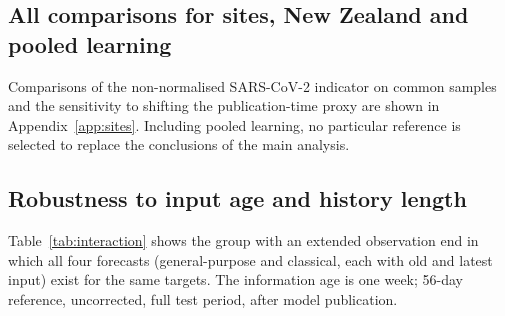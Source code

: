 \documentclass[11pt]{article}
\newcommand{\gentable}[1]{\adjustbox{max width=\linewidth}{}}
\begin{document}
\subsection{All comparisons for sites, New Zealand and pooled learning}\label{app:panel}

\begin{table}[H]\centering\small
\caption{Exploratory comparisons with one-week-earlier input for German sites and New Zealand. The numbers of sites and regions are not numbers of independent epidemics. NZ national and regional series contain the same epidemics, so mixed values are not used as the main grounds for generalisation. These are not rankings of countries or sites: targets, scales, periods and missing inputs or references differ, so rows cannot be compared directly. New Zealand publishes roughly fortnightly, so a calendar one-week-earlier input includes both identical inputs and inputs that differ by several observation weeks; it does not mean the same observation difference as in Germany. All results, including strata for missing data and information updates, are saved in the corresponding analysis outputs.}\label{tab:panel}
\gentable{tab_panel}
\end{table}

\begin{table}[H]\centering\small
\caption{Comparison with pooled learning (exploratory). The pooled model was trained separately for each country. It additionally uses matured reference values from other series, the pathogen category and the annual cycle of the target date. It is not an architecture comparison that equalises training information with the univariate general-purpose models, but a check that adds an operationally available comparator.}\label{tab:pooled}
\gentable{tab_pooled}
\end{table}

Comparisons of the non-normalised SARS-CoV-2 indicator on common samples and the sensitivity to shifting the publication-time proxy are shown in Appendix~\ref{app:sites}. Including pooled learning, no particular reference is selected to replace the conclusions of the main analysis.

\subsection{Robustness to input age and history length}\label{app:age}

Table~\ref{tab:interaction} shows the group with an extended observation end in which all four forecasts (general-purpose and classical, each with old and latest input) exist for the same targets. The information age is one week; 56-day reference, uncorrected, full test period, after model publication.
\end{document}
